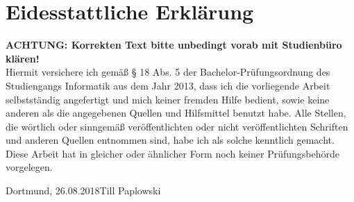 \documentclass[
	oneside,  %
	ngerman, 
	final, 
	11pt, 
	a4paper, 
	1.1headlines, 
	headinclude=false, 
	footinclude=false, 
	mpinclude=false, 
	pagesize, 
	onecolumn, 
	titlepage, 
	parskip=half, 
	headsepline, 
	chapterprefix=false, 
	version=first, 
	listof=totoc, 
	bibliography=totoc, 
	toc=graduated, 
	fleqn
]{scrbook}
\newcommand*{\fhdopaperdate}{26.08.2018}
\newcommand*{\fhdopaperauthor}{Till Paplowski}
\begin{document}
\newpage{}

\cleardoublepage{}
\listoffigures

\newpage{}

\cleardoublepage{}
\listoftables

\lstlistoflistings 
	


	
\chapter*{Eidesstattliche Erklärung}
\thispagestyle{empty}
\textbf{ACHTUNG: Korrekten Text bitte unbedingt vorab mit Studienbüro klären!}\\
Hiermit versichere ich gemäß § 18 Abs. 5 der Bachelor-Prüfungsordnung des Studiengangs Informatik aus dem Jahr 2013, dass ich die  vorliegende Arbeit selbstständig angefertigt und mich keiner fremden Hilfe bedient, sowie keine anderen als die angegebenen Quellen und Hilfsmittel benutzt habe. Alle Stellen, die wörtlich oder sinngemäß veröffentlichten oder nicht veröffentlichten Schriften und anderen Quellen entnommen sind, habe ich als solche kenntlich gemacht. Diese Arbeit hat in gleicher oder ähnlicher Form noch keiner Prüfungsbehörde vorgelegen.

\vspace{1\baselineskip}%
Dortmund, \fhdopaperdate \hfill \fhdopaperauthor
\end{document}
